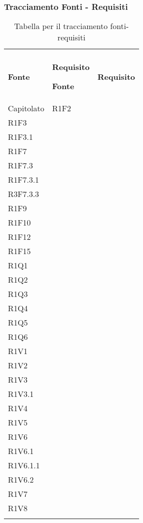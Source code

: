 \subsubsection{Tracciamento Fonti - Requisiti}

\renewcommand{\arraystretch}{2.2}

\begin{longtable}{|C{6.5cm}|C{6.5cm}|}

	\caption{Tabella per il tracciamento fonti-requisiti}\\
	\textbf{Fonte} & \textbf{Requisito}
	\endfirsthead

	\hline
	\textbf{Fonte} & \textbf{Requisito}
	\tabularnewline
	\endhead

	Capitolato &
	\centering
	R1F2\\
	R1F3 \\
	R1F3.1\\
	R1F7\\
	R1F7.3\\
	R1F7.3.1\\
	R3F7.3.3\\
	R1F9\\
	R1F10\\
	R1F12\\
	R1F15\\
	R1Q1\\
	R1Q2\\
	R1Q3\\
	R1Q4\\
	R1Q5\\
	R1Q6\\
	R1V1\\
	R1V2\\
	R1V3\\
	R1V3.1\\
	R1V4\\
	R1V5\\
	R1V6\\
	R1V6.1\\
	R1V6.1.1\\
	R1V6.2\\
	R1V7\\
	R1V8\\

	\tabularnewline


\end{longtable}

